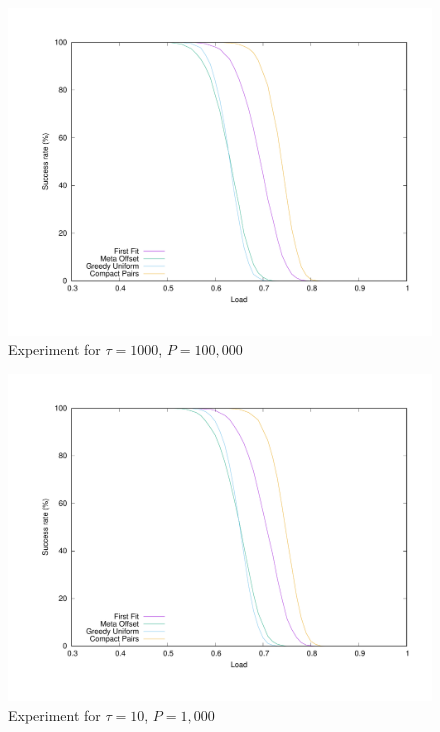 \documentclass[10pt, conference, letterpaper]{IEEEtran}
\begin{document}
\begin{figure}
\begin{center}
\includegraphics[scale=0.3]{100messBig}
\end{center}
\caption{Experiment for $\tau = 1000$, $P=100,000$}
\label{fig:100messBig}
\end{figure}

\begin{figure}
\begin{center}
\includegraphics[scale=0.3]{100messSmall}
\end{center}
\caption{Experiment for $\tau = 10$, $P=1,000$}
\label{fig:100messSmall}
\end{figure}
\end{document}
